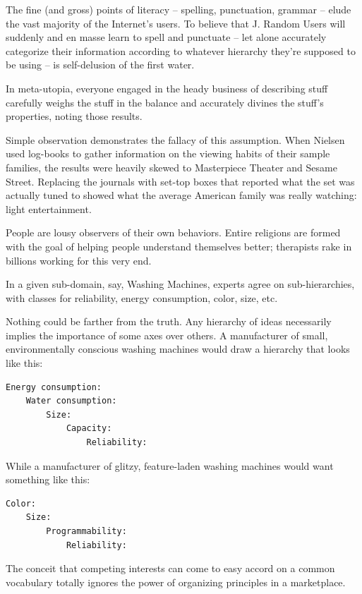 \documentclass[a4paper,landscape,headrule,footrule,xetex]{foils}
\begin{document}
The fine (and gross) points of literacy -- spelling, punctuation,
grammar -- elude the vast majority of the Internet's users. To believe
that J. Random Users will suddenly and en masse learn to spell and
punctuate -- let alone accurately categorize their information
according to whatever hierarchy they're supposed to be using -- is
self-delusion of the first water.


In meta-utopia, everyone engaged in the heady business of describing
stuff carefully weighs the stuff in the balance and accurately divines
the stuff's properties, noting those results.

Simple observation demonstrates the fallacy of this assumption. When
Nielsen used log-books to gather information on the viewing habits of
their sample families, the results were heavily skewed to Masterpiece
Theater and Sesame Street. Replacing the journals with set-top boxes
that reported what the set was actually tuned to showed what the
average American family was really watching: light entertainment.

People are lousy observers of their own behaviors. Entire religions
are formed with the goal of helping people understand themselves
better; therapists rake in billions working for this very end.



In a given sub-domain, say, Washing Machines, experts agree on
sub-hierarchies, with classes for reliability, energy consumption,
color, size, etc.

Nothing could be farther from the truth. Any hierarchy of ideas necessarily implies the importance of some axes over others. A manufacturer of small, environmentally conscious washing machines would draw a hierarchy that looks like this:
\begin{verbatim}
Energy consumption:
    Water consumption:
        Size:
            Capacity:
                Reliability:

\end{verbatim}
\newpage
While a manufacturer of glitzy, feature-laden washing machines would want something like this:
\begin{verbatim}
Color:
    Size:
        Programmability:
            Reliability:
\end{verbatim}

The conceit that competing interests can come to easy accord on a common vocabulary totally ignores the power of organizing principles in a marketplace.
\end{document}
